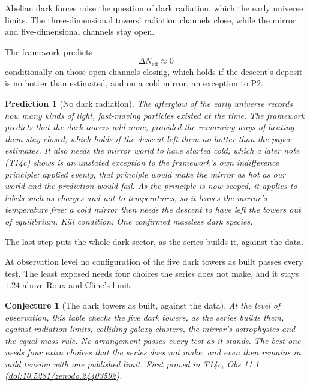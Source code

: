 \documentclass[11pt]{article}
\newtheorem{conjecture}[theorem]{Conjecture}
\newtheorem{prediction}[theorem]{Prediction}
\theoremstyle{definition}
\theoremstyle{plain}
\providecommand{\Neff}{}\renewcommand{\Neff}{N_{\mathrm{eff}}}
\begin{document}
Abelian dark forces raise the question of dark radiation, which the early universe limits. The three-dimensional towers' radiation channels close, while the mirror and five-dimensional channels stay open.

The framework predicts \[ \Delta\Neff \approx 0 \] conditionally on those open channels closing, which holds if the descent's deposit is no hotter than estimated, and on a cold mirror, an exception to P2.

\begin{prediction}[No dark radiation]\label{c:pred.no-dark-radiation}
The afterglow of the early universe records how many kinds of light, fast-moving particles existed at the time. The framework predicts that the dark towers add none, provided the remaining ways of heating them stay closed, which holds if the descent left them no hotter than the paper estimates. It also needs the mirror world to have started cold, which a later note (T14c) shows is an unstated exception to the framework's own indifference principle; applied evenly, that principle would make the mirror as hot as our world and the prediction would fail. As the principle is now scoped, it applies to labels such as charges and not to temperatures, so it leaves the mirror's temperature free; a cold mirror then needs the descent to have left the towers out of equilibrium.
\emph{Kill condition:} One confirmed massless dark species.
\end{prediction}

The last step puts the whole dark sector, as the series builds it, against the data.

At observation level no configuration of the five dark towers as built passes every test. The least exposed needs four choices the series does not make, and it stays $1.24$ above Roux and Cline's limit.

\begin{conjecture}[The dark towers as built, against the data]\label{c:dark-tower-matter.towers-built}
At the level of observation, this table checks the five dark towers, as the series builds them, against radiation limits, colliding galaxy clusters, the mirror's astrophysics and the equal-mass rule. No arrangement passes every test as it stands. The best one needs four extra choices that the series does not make, and even then remains in mild tension with one published limit.
\emph{First proved in} T14c, Obs 11.1 (\href{https://doi.org/10.5281/zenodo.24403592}{doi:10.5281/zenodo.24403592}).
\end{conjecture}
\end{document}
